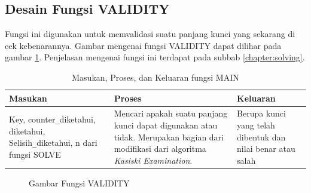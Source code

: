 	\subsection{Desain Fungsi VALIDITY}
	Fungsi ini digunakan untuk memvalidasi suatu panjang kunci yang sekarang di cek kebenarannya. Gambar mengenai fungsi VALIDITY dapat dilihar pada gambar \ref{fig:validity}. Penjelasan mengenai fungsi ini terdapat pada subbab \ref{chapter:solving}. %
	
		\begin{table}[H]
	 	\caption{Masukan, Proses, dan Keluaran fungsi MAIN}
		\begin{tabular}   {|p{3cm}|p{4cm}|p{2cm}|}\hline
		Masukan&Proses&Keluaran \\ \hline
		Key, counter\verb|_|diketahui, diketahui, Selisih\verb|_|diketahui, n dari fungsi SOLVE&Mencari apakah suatu panjang kunci dapat digunakan atau tidak. Merupakan bagian dari modifikasi dari algoritma \textit{Kasiski Examination}. &Berupa kunci yang telah dibentuk dan nilai benar atau salah\\ \hline
		\end{tabular}%
		\label{tab:iomain}
	\end{table}
	
 \begin{figure}[H]
		\centering
		\caption{Gambar Fungsi VALIDITY}
		\label{fig:validity}
	\end{figure}
	
